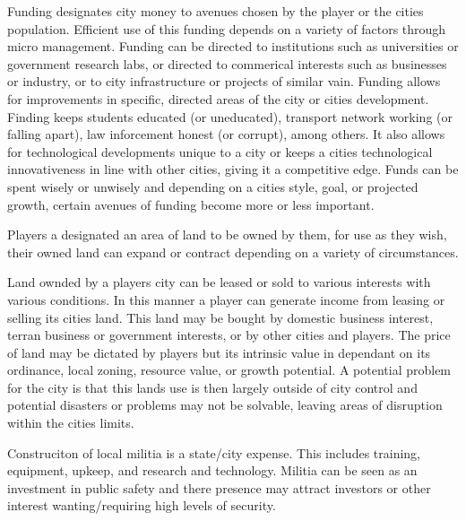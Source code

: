 Funding designates city money to avenues chosen by the player or the cities population. Efficient use of this funding depends on a variety of factors through micro management. Funding can be directed to institutions such as universities or government research labs, or directed to commerical interests such as businesses or industry, or to city infrastructure or projects of similar vain. Funding allows for improvements in specific, directed areas of the city or cities development. Finding keeps students educated (or uneducated), transport network working (or falling apart), law inforcement honest (or corrupt), among others. It also allows for technological developments unique to a city or keeps a cities technological innovativeness in line with other cities, giving it a competitive edge. Funds can be spent wisely or unwisely and depending on a cities style, goal, or projected growth, certain avenues of funding become more or less important.


Players a designated an area of land to be owned by them, for use as they wish, their owned land can expand or contract depending on a variety of circumstances. 

Land ownded by a players city can be leased or sold to various interests with various conditions. In this manner a player can generate income from leasing or selling its cities land. This land may be bought by domestic business interest, terran business or government interests, or by other cities and players. The price of land may be dictated by players but its intrinsic value in dependant on its ordinance, local zoning, resource value, or growth potential. %
A potential problem for the city is that this lands use is then largely outside of city control and potential disasters or problems may not be solvable, leaving areas of disruption within the cities limits.



Construciton of local militia is a state/city expense. This includes training, equipment, upkeep, and research and technology. Militia can be seen as an investment in public safety and there presence may attract investors or other interest wanting/requiring high levels of security.




